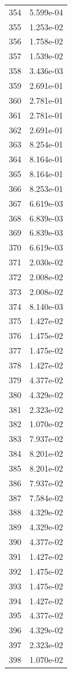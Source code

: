 \documentclass[12pt]{article}
\begin{document}
\begin{longtable}{@{}cc@{}}
354 & 5.599e-04 \\
355 & 1.253e-02 \\
356 & 1.758e-02 \\
357 & 1.539e-02 \\
358 & 3.436e-03 \\
359 & 2.691e-01 \\
360 & 2.781e-01 \\
361 & 2.781e-01 \\
362 & 2.691e-01 \\
363 & 8.254e-01 \\
364 & 8.164e-01 \\
365 & 8.164e-01 \\
366 & 8.253e-01 \\
367 & 6.619e-03 \\
368 & 6.839e-03 \\
369 & 6.839e-03 \\
370 & 6.619e-03 \\
371 & 2.030e-02 \\
372 & 2.008e-02 \\
373 & 2.008e-02 \\
374 & 8.140e-03 \\
375 & 1.427e-02 \\
376 & 1.475e-02 \\
377 & 1.475e-02 \\
378 & 1.427e-02 \\
379 & 4.377e-02 \\
380 & 4.329e-02 \\
381 & 2.323e-02 \\
382 & 1.070e-02 \\
383 & 7.937e-02 \\
384 & 8.201e-02 \\
385 & 8.201e-02 \\
386 & 7.937e-02 \\
387 & 7.584e-02 \\
388 & 4.329e-02 \\
389 & 4.329e-02 \\
390 & 4.377e-02 \\
391 & 1.427e-02 \\
392 & 1.475e-02 \\
393 & 1.475e-02 \\
394 & 1.427e-02 \\
395 & 4.377e-02 \\
396 & 4.329e-02 \\
397 & 2.323e-02 \\
398 & 1.070e-02 \\

\end{longtable}
\end{document}

